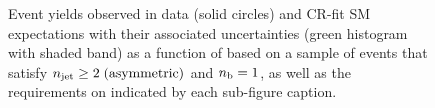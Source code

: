 \begin{figure}[h!]
\begin{center}
    \caption{Event yields observed in data (solid circles) and CR-fit SM expectations with their associated uncertainties (green histogram with shaded band) as a function of \HTmiss based on a sample of events that satisfy $n_{\text{jet}} \geq 2 \; \textrm{(asymmetric)}$ and $n_{\text{b}} = 1$, as well as the requirements on \scalht indicated by each sub-figure caption. }
    \label{fig:mhtval_ge2a_eq1b}
  \end{center}
\end{figure}

